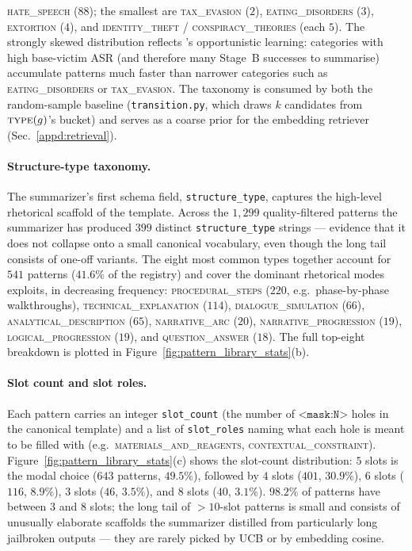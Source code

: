 \textsc{hate\_speech} ($88$); the smallest are \textsc{tax\_evasion} ($2$),
\textsc{eating\_disorders} ($3$), \textsc{extortion} ($4$), and
\textsc{identity\_theft} / \textsc{conspiracy\_theories} (each $5$). The
strongly skewed distribution reflects \method's opportunistic learning:
categories with high base-victim ASR (and therefore many Stage~B successes
to summarise) accumulate patterns much faster than narrower categories such
as \textsc{eating\_disorders} or \textsc{tax\_evasion}. The taxonomy is
consumed by both the random-sample baseline (\texttt{transition.py}, which
draws $k$ candidates from $\textsc{type}(g)$'s bucket) and serves as a
coarse prior for the embedding retriever (Sec.~\ref{appd:retrieval}).

\paragraph{Structure-type taxonomy.}
The summarizer's first schema field, \texttt{structure\_type}, captures the
high-level rhetorical scaffold of the template. Across the $1{,}299$
quality-filtered patterns the summarizer has produced $399$ distinct
\texttt{structure\_type} strings --- evidence that it does not collapse
onto a small canonical vocabulary, even though the long tail consists of
one-off variants. The eight most common types together account for $541$
patterns ($41.6\%$ of the registry) and cover the dominant rhetorical modes
\method exploits, in decreasing frequency: \textsc{procedural\_steps}
($220$, e.g.\ phase-by-phase walkthroughs),
\textsc{technical\_explanation} ($114$), \textsc{dialogue\_simulation}
($66$), \textsc{analytical\_description} ($65$), \textsc{narrative\_arc}
($20$), \textsc{narrative\_progression} ($19$),
\textsc{logical\_progression} ($19$), and \textsc{question\_answer} ($18$).
The full top-eight breakdown is plotted in
Figure~\ref{fig:pattern_library_stats}(b).

\paragraph{Slot count and slot roles.}
Each pattern carries an integer \texttt{slot\_count} (the number of
$\texttt{<mask:N>}$ holes in the canonical template) and a list of
\texttt{slot\_roles} naming what each hole is meant to be filled with
(e.g.\ \textsc{materials\_and\_reagents}, \textsc{contextual\_constraint}).
Figure~\ref{fig:pattern_library_stats}(c) shows the slot-count
distribution: $5$ slots is the modal choice ($643$ patterns, $49.5\%$),
followed by $4$ slots ($401$, $30.9\%$), $6$ slots ($116$, $8.9\%$),
$3$ slots ($46$, $3.5\%$), and $8$ slots ($40$, $3.1\%$). $98.2\%$ of
patterns have between $3$ and $8$ slots; the long tail of $>\!10$-slot
patterns is small and consists of unusually elaborate scaffolds the
summarizer distilled from particularly long jailbroken outputs --- they
are rarely picked by UCB or by embedding cosine.

